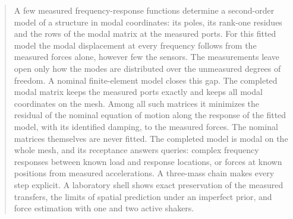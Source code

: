 \begin{abstract}
A few measured frequency-response functions determine a second-order model
of a structure in modal coordinates: its poles, its rank-one residues and
the rows of the modal matrix at the measured ports. For this fitted model
the modal displacement at every frequency follows from the measured forces
alone, however few the sensors. The measurements leave open only how the
modes are distributed over the unmeasured degrees of freedom. A nominal
finite-element model closes this gap. The completed modal matrix keeps the
measured ports exactly and keeps all modal coordinates on the mesh. Among
all such matrices it minimizes the residual of the nominal equation of
motion along the response of the fitted model, with its identified damping,
to the measured forces. The nominal matrices themselves are never fitted.
The completed model is modal on the whole mesh, and its receptance answers
queries: complex frequency responses between known load and response
locations, or forces at known positions from measured accelerations. A
three-mass chain makes every step explicit. A laboratory shell shows exact
preservation of the measured transfers, the limits of spatial prediction
under an imperfect prior, and force estimation with one and two active
shakers.
\end{abstract}
